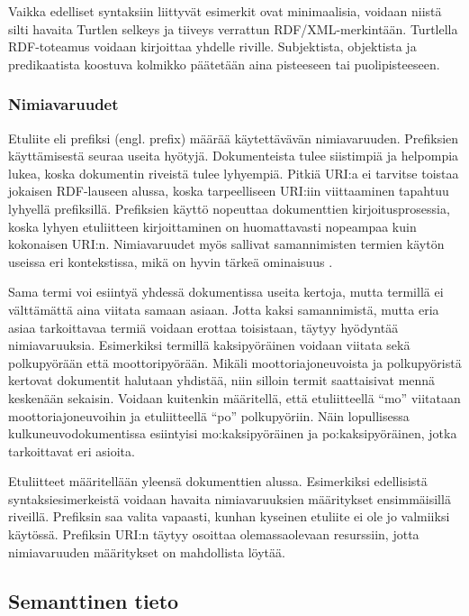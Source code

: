 \documentclass[finnish, 12pt, a4paper, elec, utf8, pdfa, online]{aaltothesis}
\begin{document}
Vaikka edelliset syntaksiin liittyvät esimerkit ovat minimaalisia, voidaan niistä silti havaita Turtlen selkeys ja tiiveys verrattun RDF/XML-merkintään. Turtlella RDF-toteamus voidaan kirjoittaa yhdelle riville. Subjektista, objektista ja predikaatista koostuva kolmikko päätetään aina pisteeseen tai puolipisteeseen.


\subsubsection{Nimiavaruudet}
Etuliite eli prefiksi (engl. prefix) määrää käytettävävän nimiavaruuden. Prefiksien käyttämisestä seuraa useita hyötyjä. Dokumenteista tulee siistimpiä ja helpompia lukea, koska dokumentin riveistä tulee lyhyempiä. Pitkiä URI:a ei tarvitse toistaa jokaisen RDF-lauseen alussa, koska tarpeelliseen URI:iin viittaaminen tapahtuu lyhyellä prefiksillä. Prefiksien käyttö nopeuttaa dokumenttien kirjoitusprosessia, koska lyhyen etuliitteen kirjoittaminen on huomattavasti nopeampaa kuin kokonaisen URI:n. Nimiavaruudet myös sallivat samannimisten termien käytön useissa eri kontekstissa, mikä on hyvin tärkeä ominaisuus \cite{Antoniou}.

Sama termi voi esiintyä yhdessä dokumentissa useita kertoja, mutta termillä ei välttämättä aina viitata samaan asiaan. Jotta kaksi samannimistä, mutta eria asiaa tarkoittavaa termiä voidaan erottaa toisistaan, täytyy hyödyntää nimiavaruuksia. Esimerkiksi termillä kaksipyöräinen voidaan viitata sekä polkupyörään että moottoripyörään. Mikäli moottoriajoneuvoista ja polkupyöristä kertovat dokumentit halutaan yhdistää, niin silloin termit saattaisivat mennä keskenään sekaisin. Voidaan kuitenkin määritellä, että etuliitteellä ``mo'' viitataan moottoriajoneuvoihin ja etuliitteellä ``po'' polkupyöriin. Näin lopullisessa kulkuneuvodokumentissa esiintyisi mo:kaksipyöräinen ja po:kaksipyöräinen, jotka tarkoittavat eri asioita.

Etuliitteet määritellään yleensä dokumenttien alussa. Esimerkiksi edellisistä syntaksiesimerkeistä voidaan havaita nimiavaruuksien määritykset ensimmäisillä riveillä. Prefiksin saa valita vapaasti, kunhan kyseinen etuliite ei ole jo valmiiksi käytössä. Prefiksin URI:n täytyy osoittaa olemassaolevaan resurssiin, jotta nimiavaruuden määritykset on mahdollista löytää.

\subsection{Semanttinen tieto}
\end{document}
